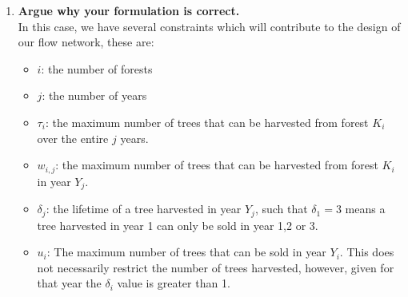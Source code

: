 \documentclass[11pt, oneside]{article}   	%
\begin{document}
\begin{enumerate}
\begin{enumerate}
\\
		\newpage
		\item \textbf{Argue why your formulation is correct.}\\
		In this case, we have several constraints which will contribute to the design of our flow network, these are:
		\begin{itemize}
		\item $i$: the number of forests
		\item $j$: the number of years
		\item $\tau_i$: the maximum number of trees that can be harvested from forest $K_i$ over the entire $j$ years.
		\item $w_{i,j}$: the maximum number of trees that can be harvested from forest $K_i$ in year $Y_j$.
		\item $\delta_j$: the lifetime of a tree harvested in year $Y_j$, such that $\delta_1=3$ means a tree harvested in year 1 can only be sold in year 1,2 or 3.
		\item $u_i$: The maximum number of trees that can be sold in year $Y_i$. This does not necessarily restrict the number of trees harvested, however, given for that year the $\delta_i$ value is greater than 1.
		\end{itemize}
		

\end{enumerate}
\end{enumerate}
\end{document}
